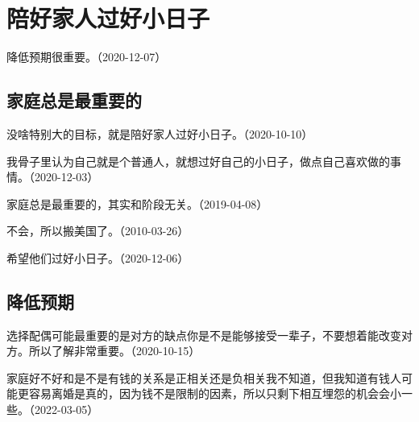 
\section{陪好家人过好小日子}


降低预期很重要。（2020-12-07）

\subsection{家庭总是最重要的}


没啥特别大的目标，就是陪好家人过好小日子。（2020-10-10）

我骨子里认为自己就是个普通人，就想过好自己的小日子，做点自己喜欢做的事情。（2020-12-03）


家庭总是最重要的，其实和阶段无关。（2019-04-08）


不会，所以搬美国了。（2010-03-26）


希望他们过好小日子。（2020-12-06）

\subsection{降低预期}


选择配偶可能最重要的是对方的缺点你是不是能够接受一辈子，不要想着能改变对方。所以了解非常重要。（2020-10-15）


家庭好不好和是不是有钱的关系是正相关还是负相关我不知道，但我知道有钱人可能更容易离婚是真的，因为钱不是限制的因素，所以只剩下相互埋怨的机会会小一些。（2022-03-05）


